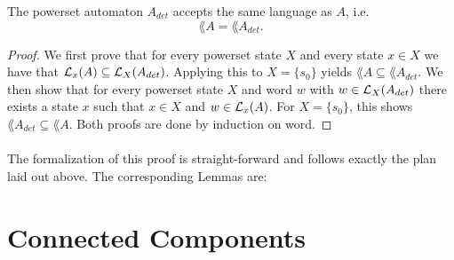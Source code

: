 \documentclass[11pt,a4paper,oneside]{book}
\begin{document}
                    \vspace{-0.4cm}
                    \vspace{-0.4cm}

                    \begin{theorem}
                        The powerset automaton $A_{det}$ accepts the same language as $A$, i.e.
                        \[
                            \lang{A} = \lang{A_{det}}.
                        \]
                    \end{theorem}

                    \begin{proof}
                        We first prove that for every powerset state $X$ and every state $x \in X$ we have that $\mathcal{L}_x(A) \subseteq \mathcal{L}_X(A_{det})$. 
                        Applying this to $X=\{s_0\}$ yields $\lang{A} \subseteq \lang{A_{det}}$.
                        We then show that for every powerset state $X$ and word $w$ with $w \in \mathcal{L}_X(A_{det})$ there exists a state $x$ such that $x \in X$ and $w \in \mathcal{L}_x(A)$. 
                        For $X = \{s_0\}$, this shows $\lang{A_{det}} \subseteq \lang{A}$.
                        Both proofs are done by induction on word.
                    \end{proof}

                    \paragraph{}
                        The formalization of this proof is straight-forward and follows exactly the plan laid out above. 
                        The corresponding Lemmas are:
                        \vspace{-0.4cm}
                        \vspace{-0.4cm}
                        

        \section{Connected Components}
\end{document}
